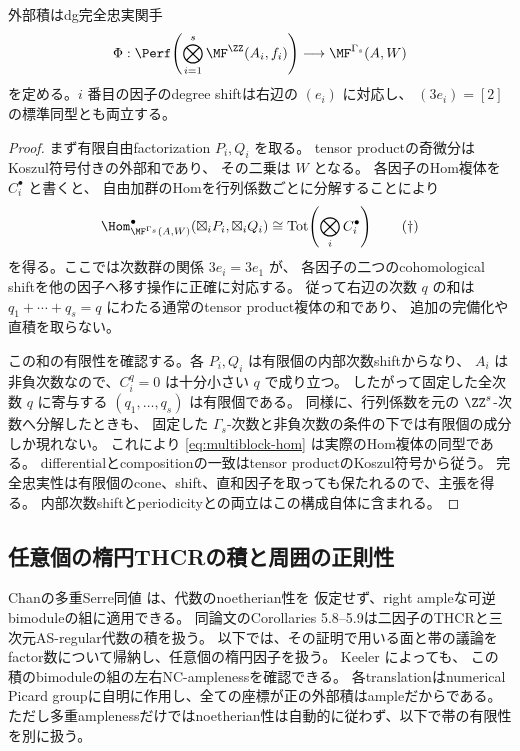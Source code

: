 \begin{lemma}[外部積の完全忠実性]\label{lem:multiblock-ff}
 外部積はdg完全忠実関手
 \[
 \Phi:\Perf\!\left(\bigotimes_{i=1}^s\MF^{\ZZ}(A_i,f_i)\right)
 \longrightarrow\MF^{\Gamma_s}(A,W)
 \]
 を定める。\(i\) 番目の因子のdegree shiftは右辺の \((e_i)\) に対応し、
 \((3e_i)=[2]\) の標準同型とも両立する。
\end{lemma}
\begin{proof}
 まず有限自由factorization \(P_i,Q_i\) を取る。
 tensor productの奇微分はKoszul符号付きの外部和であり、
 その二乗は \(W\) となる。
 各因子のHom複体を \(C_i^\bullet\) と書くと、
 自由加群のHomを行列係数ごとに分解することにより
 \[
 \Hom_{\MF^{\Gamma_s}(A,W)}^\bullet
       (\boxtimes_iP_i,\boxtimes_iQ_i)
 \cong
 \operatorname{Tot}\!\left(\bigotimes_i C_i^\bullet\right)
 \tag{\(\dagger\)}\label{eq:multiblock-hom}
 \]
 を得る。ここでは次数群の関係 \(3e_i=3e_1\) が、
 各因子の二つのcohomological shiftを他の因子へ移す操作に正確に対応する。
 従って右辺の次数 \(q\) の和は
 \(q_1+\cdots+q_s=q\) にわたる通常のtensor product複体の和であり、
 追加の完備化や直積を取らない。

 この和の有限性を確認する。各 \(P_i,Q_i\) は有限個の内部次数shiftからなり、
 \(A_i\) は非負次数なので、\(C_i^q=0\) は十分小さい \(q\) で成り立つ。
 したがって固定した全次数 \(q\) に寄与する \((q_1,\ldots,q_s)\) は有限個である。
 同様に、行列係数を元の \(\ZZ^s\)-次数へ分解したときも、
 固定した \(\Gamma_s\)-次数と非負次数の条件の下では有限個の成分しか現れない。
 これにより \eqref{eq:multiblock-hom} は実際のHom複体の同型である。
 differentialとcompositionの一致はtensor productのKoszul符号から従う。
 完全忠実性は有限個のcone、shift、直和因子を取っても保たれるので、主張を得る。
 内部次数shiftとperiodicityとの両立はこの構成自体に含まれる。
\end{proof}

\subsection{任意個の楕円THCRの積と周囲の正則性}

Chanの多重Serre同値 \cite[Theorem 3.4]{ChanMulti} は、代数のnoetherian性を
仮定せず、right ampleな可逆bimoduleの組に適用できる。
同論文のCorollaries 5.8--5.9は二因子のTHCRと三次元AS-regular代数の積を扱う。
以下では、その証明で用いる面と帯の議論をfactor数について帰納し、任意個の楕円因子を扱う。
Keeler \cite[Theorem 2.7, Corollary 2.8]{KeelerMulti} によっても、
この積のbimoduleの組の左右NC-amplenessを確認できる。
各translationはnumerical Picard groupに自明に作用し、全ての座標が正の外部積はampleだからである。
ただし多重amplenessだけではnoetherian性は自動的に従わず、以下で帯の有限性を別に扱う。

